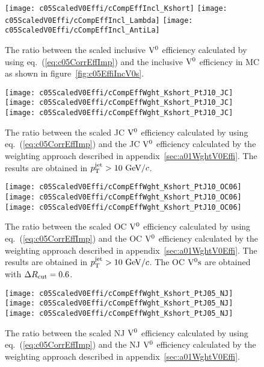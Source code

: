 \begin{figure}[htb]
\begin{center}
\texttt{[image: c05ScaledV0Effi/cCompEffIncl\_Kshort]}
\texttt{[image: c05ScaledV0Effi/cCompEffIncl\_Lambda]}
\texttt{[image: c05ScaledV0Effi/cCompEffIncl\_AntiLa]}
\caption{The ratio between the scaled inclusive ${\rm V}^{0}$ efficiency
         calculated by using eq.~(\ref{eq:c05CorrEffImp}) and the
         inclusive ${\rm V}^{0}$ efficiency in MC as shown
         in figure~\ref{fig:c05EffiIncV0s}.}
\label{fig:c05CompScaledEff}
\end{center}
\end{figure}

\begin{figure}[htb]
\begin{center}
\texttt{[image: c05ScaledV0Effi/cCompEffWght\_Kshort\_PtJ10\_JC]}
\texttt{[image: c05ScaledV0Effi/cCompEffWght\_Kshort\_PtJ10\_JC]}
\texttt{[image: c05ScaledV0Effi/cCompEffWght\_Kshort\_PtJ10\_JC]}
\caption{The ratio between the scaled JC ${\rm V}^{0}$ efficiency calculated by
         using eq.~(\ref{eq:c05CorrEffImp}) and the JC ${\rm V}^{0}$ efficiency
         calculated by the weighting approach described in
         appendix~\ref{sec:a01WghtV0Effi}.
         The results are obtained in $p_{\rm T}^{\rm jet}>10~{\rm GeV}/c$.}
\label{fig:c05CompScaledWghtPtJ10JC}
\end{center}
\end{figure}

\begin{figure}[htb]
\begin{center}
\texttt{[image: c05ScaledV0Effi/cCompEffWght\_Kshort\_PtJ10\_OC06]}
\texttt{[image: c05ScaledV0Effi/cCompEffWght\_Kshort\_PtJ10\_OC06]}
\texttt{[image: c05ScaledV0Effi/cCompEffWght\_Kshort\_PtJ10\_OC06]}
\caption{The ratio between the scaled OC ${\rm V}^{0}$ efficiency calculated by
         using eq.~(\ref{eq:c05CorrEffImp}) and the OC ${\rm V}^{0}$ efficiency
         calculated by the weighting approach described in
         appendix~\ref{sec:a01WghtV0Effi}.
         The results are obtained in $p_{\rm T}^{\rm jet}>10~{\rm GeV}/c$.
         The OC ${\rm V}^{0}{\rm s}$ are obtained with $\Delta R_{\rm cut}=0.6$.}
\label{fig:c05CompScaledWghtPtJ10OC06}
\end{center}
\end{figure}

\begin{figure}[htb]
\begin{center}
\texttt{[image: c05ScaledV0Effi/cCompEffWght\_Kshort\_PtJ05\_NJ]}
\texttt{[image: c05ScaledV0Effi/cCompEffWght\_Kshort\_PtJ05\_NJ]}
\texttt{[image: c05ScaledV0Effi/cCompEffWght\_Kshort\_PtJ05\_NJ]}
\caption{The ratio between the scaled NJ ${\rm V}^{0}$ efficiency calculated by
         using eq.~(\ref{eq:c05CorrEffImp}) and the NJ ${\rm V}^{0}$ efficiency
         calculated by the weighting approach described in
         appendix~\ref{sec:a01WghtV0Effi}.}
\label{fig:c05CompScaledWghtPtJ10NJ}
\end{center}
\end{figure}

